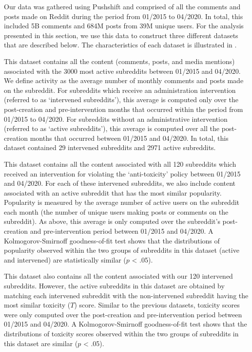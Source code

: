Our data was gathered using Pushshift \cite{PushShift-Reddit} and comprised of
all the comments and posts made on Reddit during the period from 01/2015 to
04/2020. In total, this included 5B comments and 684M posts from 39M unique
users. For the analysis presented in this section, we use this data to
construct three different datasets that are described below. The
characteristics of each dataset is illustrated in
.

 This dataset contains all
the content (comments, posts, and media mentions) associated with the 3000 most
active subreddits between 01/2015 and 04/2020. We define activity as the
average number of monthly comments and posts made on the subreddit. For
subreddits which receive an administration intervention (referred to as
`intervened subreddits'), this average is computed only over the post-creation
and pre-intervention months that occurred within the period from 01/2015 to
04/2020. For subreddits without an administrative intervention (referred to as
`active subreddits'), this average is computed over all the post-creation
months that occurred between 01/2015 and 04/2020. In total, this dataset
contained 29 intervened subreddits and 2971 active subreddits.

 This dataset
contains all the content associated with all 120 subreddits which received an 
intervention for violating the `anti-toxicity' policy between 01/2015 and
04/2020. For each of these intervened subreddits, we also include content
associated with an active subreddit that has the most similar popularity.
Popularity is measured by the average number of active users on the subreddit
each month (\ie the number of unique users making posts or comments on the
subreddit). As above, this average is only computed over the subreddit's
post-creation and pre-intervention period between 01/2015 and 04/2020.
A Kolmogorov-Smirnoff goodness-of-fit test shows that the
distributions of popularity observed within the two groups of subreddits in
this dataset (\ie active and intervened) are statistically similar ($p$ < .05).

 This dataset also
contains all the content associated with our 120 intervened subreddits.
However, the active subreddits in this dataset are obtained by matching each
intervened subreddit with the non-intervened subreddit having the most similar
toxicity ($T$) score. Similar to the previous datasets, toxicity scores were
only computed over the post-creation and pre-intervention period between
01/2015 and 04/2020. A Kolmogorov-Smirnoff goodness-of-fit test shows that the
distributions of toxicity scores observed within the two groups of subreddits
in this dataset are similar ($p$ < .05).


